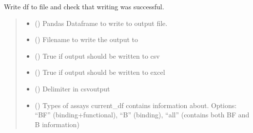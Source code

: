 \documentclass[letterpaper,10pt,english]{sphinxmanual}
\begin{document}
\begin{fulllineitems}
\label{\detokenize{write_subsets:write_subsets.write_and_check_output}}
\pysigstartsignatures
{}
\pysigstopsignatures
\sphinxAtStartPar
Write df to file and check that writing was successful.
\begin{quote}\begin{description}
\begin{itemize}
\item {} 
\sphinxAtStartPar
{} () \textendash{} Pandas Dataframe to write to output file.

\item {} 
\sphinxAtStartPar
{} () \textendash{} Filename to write the output to

\item {} 
\sphinxAtStartPar
{} () \textendash{} True if output should be written to csv

\item {} 
\sphinxAtStartPar
{} () \textendash{} True if output should be written to excel

\item {} 
\sphinxAtStartPar
{} () \textendash{} Delimiter in csv\sphinxhyphen{}output

\item {} 
\sphinxAtStartPar
{} () \textendash{} Types of assays current\_df contains information about.         Options: “BF” (binding+functional), “B” (binding), “all” (contains both BF and B information)


\end{itemize}
\end{description}
\end{quote}
\end{fulllineitems}
\end{document}

